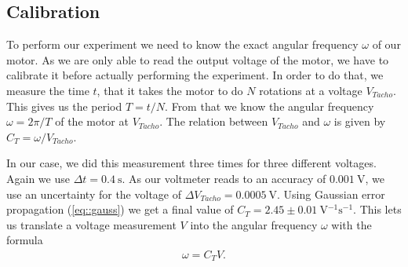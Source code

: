 \subsection{Calibration}

To perform our experiment we need to know the exact angular frequency $\omega$ of our motor.
As we are only able to read the output voltage of the motor, we have to calibrate it before actually performing the experiment.
In order to do that, we measure the time $t$, that it takes the motor to do $N$ rotations at a voltage $V_{Tacho}$.
This gives us the period $T = t/N$.
From that we know the angular frequency  $\omega = 2 \pi/T$  of the motor at $V_{Tacho}$.
The relation between $V_{Tacho}$ and $\omega$ is given by $C_T = \omega/V_{Tacho}$.

In our case, we did this measurement three times for three different voltages.
Again we use $\Delta t = \SI{0.4}{\second}$.
As our voltmeter reads to an accuracy of $\SI{0.001}{\volt}$, we use an uncertainty for the voltage of $\Delta V_{Tacho} = \SI{0.0005}{\volt}$.
Using Gaussian error propagation (\ref{eq::gauss}) we get a final value of $C_T = 2.45 \pm \SI{0.01}{\volt^{-1}\second^{-1}}$.
This lets us translate a voltage measurement $V$ into the angular frequency $\omega$ with the formula \begin{align}
	\omega = C_T V.
	\label{eq::calibration}
\end{align}


